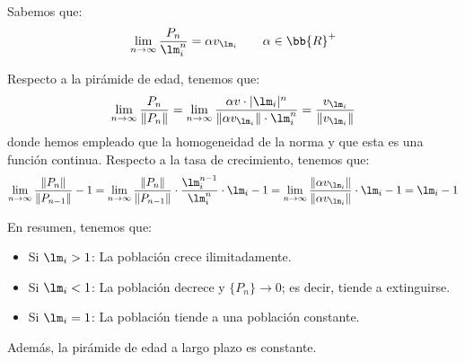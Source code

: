 Sabemos que:
\begin{equation*}
    \lim_{n\to \infty} \frac{P_n}{\lm_i^n} = \alpha v_{\lm_i} \qquad \alpha\in \bb{R}^+
\end{equation*}

Respecto a la pirámide de edad, tenemos que:
\begin{equation*}
    \lim_{n\to \infty} \frac{P_n}{\|P_n\|}
    = \lim_{n\to \infty} \frac{\alpha v\cdot |\lm_i|^n}{\|\alpha v_{\lm_i}\|\cdot \lm_i^n} = \frac{v_{\lm_i}}{\|v_{\lm_i}\|}
\end{equation*}
donde hemos empleado que la homogeneidad de la norma y que esta es una función continua.
Respecto a la tasa de crecimiento, tenemos que:
\begin{equation*}
    \lim_{n\to \infty} \frac{\|P_n\|}{\|P_{n-1}\|}-1
    = \lim_{n\to \infty} \frac{\|P_n\|}{\|P_{n-1}\|}\cdot \frac{\lm_i^{n-1}}{\lm_i^n}\cdot \lm_i-1
    = \lim_{n\to \infty} \frac{\|\alpha v_{\lm_i}\|}{\|\alpha v_{\lm_i}\|} \cdot \lm_i -1 = \lm_i-1
\end{equation*}

En resumen, tenemos que:
\begin{itemize}
    \item Si $\lm_i>1$: La población crece ilimitadamente.
    \item Si $\lm_i<1$: La población decrece y $\{P_n\}\to 0$; es decir, tiende a extinguirse.
    \item Si $\lm_i=1$: La población tiende a una población constante.
\end{itemize}
Además, la pirámide de edad a largo plazo es constante.\\

